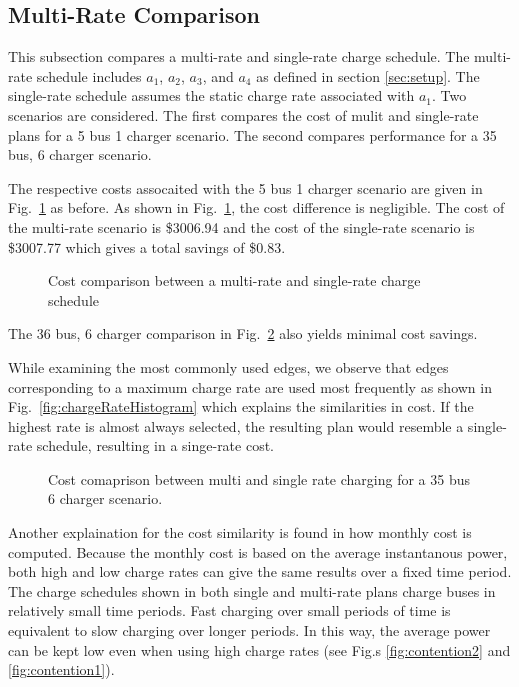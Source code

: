 \subsection{Multi-Rate Comparison}
This subsection compares a multi-rate and single-rate charge schedule. The multi-rate schedule includes $a_1$, $a_2$, $a_3$, and $a_4$ as defined in section \ref{sec:setup}.  The single-rate schedule assumes the static charge rate associated with $a_1$. Two scenarios are considered.  The first compares the cost of mulit and single-rate plans for a 5 bus 1 charger scenario. The second compares performance for a 35 bus, 6 charger scenario. 
\par The respective costs assocaited with the 5 bus 1 charger scenario are given in Fig.~\ref{fig:multiRateCostComparison} as before.  As shown in Fig.~\ref{fig:multiRateCostComparison}, the cost difference is negligible.  The cost of the multi-rate scenario is \$3006.94 and the cost of the single-rate scenario is \$3007.77 which gives a total savings of \$0.83.
\begin{figure}
	\centering
	\caption{Cost comparison between a multi-rate and single-rate charge schedule}
	\label{fig:multiRateCostComparison}
\end{figure}
The 36 bus, 6 charger comparison in Fig.~\ref{fig:costComparisonMultiVsSingleLarge} also yields minimal cost savings. 
\par While examining the most commonly used edges, we observe that edges corresponding to a maximum charge rate are used most frequently as shown in Fig.~\ref{fig:chargeRateHistogram} which explains the similarities in cost. If the highest rate is almost always selected, the resulting plan would resemble a single-rate schedule, resulting in a singe-rate cost.  
\begin{figure}
	\caption{Cost comaprison between multi and single rate charging for a 35 bus 6 charger scenario.}
	\label{fig:costComparisonMultiVsSingleLarge}
\end{figure}
\par Another explaination for the cost similarity is found in how monthly cost is computed. Because the monthly cost is based on the average instantanous power, both high and low charge rates can give the same results over a fixed time period. The charge schedules shown in both single and multi-rate plans charge buses in relatively small time periods. Fast charging over small periods of time is equivalent to slow charging over longer periods. In this way, the average power can be kept low even when using high charge rates (see Fig.s \ref{fig:contention2} and \ref{fig:contention1}). 

